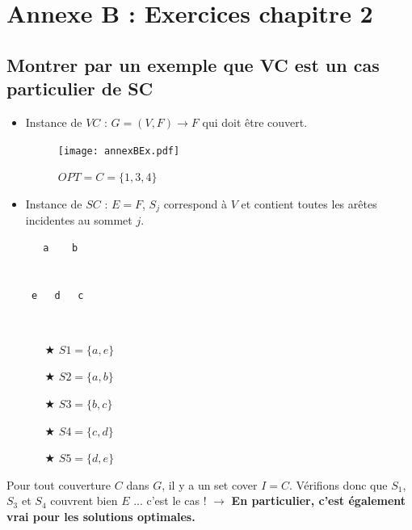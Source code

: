 \documentclass[12pt]{article}
\newcommand{\titre}[1]{\textcolor{title}{#1}}
\begin{document}
\section{Annexe B : Exercices chapitre 2}\label{exochap2}

\subsection*{Montrer par un exemple que \titre{VC} est un cas particulier de \titre{SC}}

\begin{itemize}
\item Instance de $VC$ : $G=(V,F) \rightarrow F$ qui doit être couvert.

\begin{figure}[H]
	\begin{center}
    \texttt{[image: annexBEx.pdf]}
    \caption{$OPT = C = \{1,3,4\}$}
    \end{center}
\end{figure}

\item Instance de $SC$ : $E = F$, $S_j$ correspond à $V$ et contient toutes les arêtes incidentes au sommet $j$. \\

\begin{multicols}{2}
\begin{verbatim}
   a    b


 e   d   c
\end{verbatim}
$ $\\
\begin{itemize}
\item[$\bigstar$] $S1 = \{a,e\}$
\item[$\bigstar$] $S2 = \{a,b\}$
\item[$\bigstar$] $S3 = \{b,c\}$
\item[$\bigstar$] $S4 = \{c,d\}$
\item[$\bigstar$] $S5 = \{d,e\}$\\
\end{itemize}
\end{multicols}

\end{itemize}

\noindent Pour tout couverture $C$ dans $G$, il y a un set cover $I = C$. Vérifions donc que $S_1$, $S_3$ et $S_4$ couvrent bien $E$ ...
c'est le cas ! $\longrightarrow$ \textbf{En particulier, c'est également vrai pour les solutions optimales.}
\end{document}
